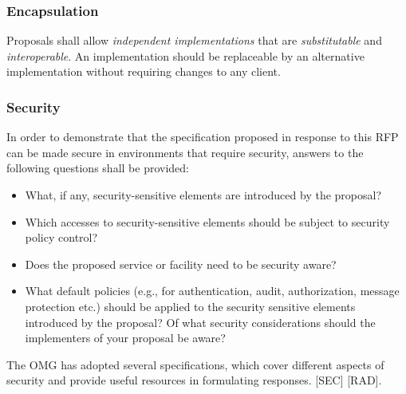 \subsubsection{Encapsulation}
Proposals shall allow \textit{independent implementations} that are \textit{substitutable} and \textit{interoperable}. An implementation should be replaceable by an alternative implementation without requiring changes to any client.
\subsubsection{Security}\label{security}
In order to demonstrate that the specification proposed in response to this RFP can be made secure in environments that require security, answers to the following questions shall be provided:
\begin{itemize}
\item    What, if any, security-sensitive elements are introduced by the proposal? 
\item    Which accesses to security-sensitive elements should be subject to security policy control?
\item    Does the proposed service or facility need to be security aware?
\item    What default policies (e.g., for authentication, audit, authorization, message protection etc.) should be applied to the security sensitive elements introduced by the proposal? Of what security considerations should the implementers of your proposal be aware? 
\end{itemize}
The OMG has adopted several specifications, which cover different aspects of security and provide useful resources in formulating responses. [SEC] [RAD].

